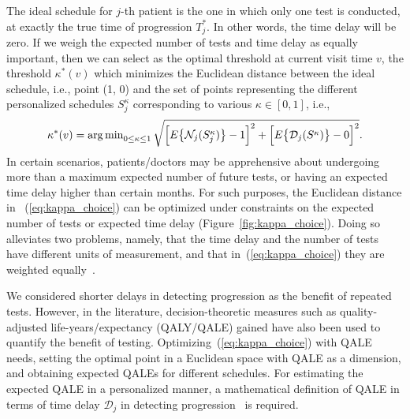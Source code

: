 The ideal schedule for $j$-th patient is the one in which only one test is conducted, at exactly the true time of progression $T^*_j$. In other words, the time delay will be zero. If we weigh the expected number of tests and time delay as equally important, then we can select as the optimal threshold at current visit time $v$, the threshold $\kappa^*(v)$ which minimizes the Euclidean distance between the ideal schedule, i.e., point (1, 0) and the set of points representing the different personalized schedules $S^{\kappa}_j$ corresponding to various $\kappa \in [0, 1]$, i.e.,
\begin{equation}
\label{eq:kappa_choice}
\kappa^*(v) = \operatorname{arg\,min}_{0 \leq \kappa \leq 1} \sqrt{\Big[E\big\{\mathcal N_j(S^\kappa_j)\big\} - 1\Big]^2 + \Big[E\big\{\mathcal D_j(S^\kappa )\big\} - 0\Big]^2}.
\end{equation}
In certain scenarios, patients/doctors may be apprehensive about undergoing more than a maximum expected number of future tests, or having an expected time delay higher than certain months. For such purposes, the Euclidean distance in ~(\ref{eq:kappa_choice}) can be optimized under constraints on the expected number of tests or expected time delay (Figure~\ref{fig:kappa_choice}). Doing so alleviates two problems, namely, that the time delay and the number of tests have different units of measurement, and that in~(\ref{eq:kappa_choice}) they are weighted equally~\citep{cook1994equivalence}.

We considered shorter delays in detecting progression as the benefit of repeated tests. However, in the literature, decision-theoretic measures such as quality-adjusted life-years/expectancy (QALY/QALE) gained \citep{sassi2006calculating} have also been used to quantify the benefit of testing. Optimizing~(\ref{eq:kappa_choice}) with QALE needs, setting the optimal point in a Euclidean space with QALE as a dimension, and obtaining expected QALEs for different schedules. For estimating the expected QALE in a personalized manner, a mathematical definition of QALE in terms of time delay $\mathcal{D}_j$ in detecting progression~\citep{de2017should} is required.